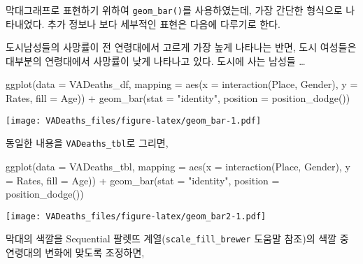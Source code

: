 \documentclass[
]{article}
\newenvironment{Shaded}{\begin{snugshade}}{\end{snugshade}}
\newcommand{\AttributeTok}[1]{\textcolor[rgb]{0.77,0.63,0.00}{#1}}
\newcommand{\FunctionTok}[1]{\textcolor[rgb]{0.00,0.00,0.00}{#1}}
\newcommand{\NormalTok}[1]{#1}
\newcommand{\SpecialCharTok}[1]{\textcolor[rgb]{0.00,0.00,0.00}{#1}}
\newcommand{\StringTok}[1]{\textcolor[rgb]{0.31,0.60,0.02}{#1}}
\begin{document}
막대그래프로 표현하기 위하여 \texttt{geom\_bar()}를 사용하였는데, 가장
간단한 형식으로 나타내었다. 추가 정보나 보다 세부적인 표현은 다음에
다루기로 한다.

도시남성들의 사망률이 전 연령대에서 고르게 가장 높게 나타나는 반면, 도시
여성들은 대부분의 연령대에서 사망률이 낮게 나타나고 있다. 도시에 사는
남성들 \ldots{}

\begin{Shaded}
\begin{Highlighting}[]
\FunctionTok{ggplot}\NormalTok{(}\AttributeTok{data =}\NormalTok{ VADeaths\_df,}
              \AttributeTok{mapping =} \FunctionTok{aes}\NormalTok{(}\AttributeTok{x =} \FunctionTok{interaction}\NormalTok{(Place, Gender), }
                            \AttributeTok{y =}\NormalTok{ Rates, }
                            \AttributeTok{fill =}\NormalTok{ Age)) }\SpecialCharTok{+}
\FunctionTok{geom\_bar}\NormalTok{(}\AttributeTok{stat =} \StringTok{"identity"}\NormalTok{, }
         \AttributeTok{position =} \FunctionTok{position\_dodge}\NormalTok{())}
\end{Highlighting}
\end{Shaded}

\texttt{[image: VADeaths\_files/figure-latex/geom\_bar-1.pdf]}

동일한 내용을 \texttt{VADeaths\_tbl}로 그리면,

\begin{Shaded}
\begin{Highlighting}[]
\FunctionTok{ggplot}\NormalTok{(}\AttributeTok{data =}\NormalTok{ VADeaths\_tbl,}
              \AttributeTok{mapping =} \FunctionTok{aes}\NormalTok{(}\AttributeTok{x =} \FunctionTok{interaction}\NormalTok{(Place, Gender), }
                            \AttributeTok{y =}\NormalTok{ Rates, }
                            \AttributeTok{fill =}\NormalTok{ Age)) }\SpecialCharTok{+}
\FunctionTok{geom\_bar}\NormalTok{(}\AttributeTok{stat =} \StringTok{"identity"}\NormalTok{, }
         \AttributeTok{position =} \FunctionTok{position\_dodge}\NormalTok{())}
\end{Highlighting}
\end{Shaded}

\texttt{[image: VADeaths\_files/figure-latex/geom\_bar2-1.pdf]}

막대의 색깔을 Sequential 팔렛뜨 계열(\texttt{scale\_fill\_brewer} 도움말
참조)의 색깔 중 연령대의 변화에 맞도록 조정하면,
\end{document}

